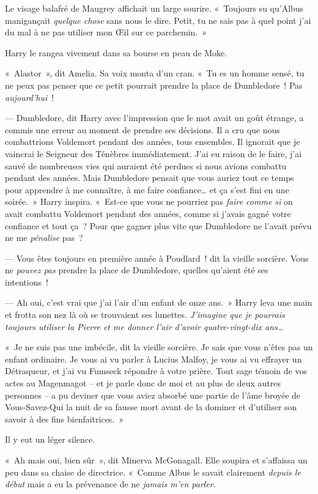 Le visage balafré de Maugrey affichait un large sourire.
«~Toujours su qu'Albus manigançait \emph{quelque chose} sans nous le dire.
Petit, tu ne sais pas à quel point j'ai du mal à ne pas utiliser mon Œil sur ce parchemin.~»

Harry le rangea vivement dans sa bourse en peau de Moke.

«~Alastor~», dit Amelia.
Sa voix monta d'un cran.
«~Tu es un homme sensé, tu ne peux pas penser que ce petit pourrait prendre la place de Dumbledore~!
Pas \emph{aujourd'hui}~!

--- Dumbledore, dit Harry avec l'impression que le mot avait un goût étrange, a commis une erreur au moment de prendre ses décisions.
Il a cru que nous combattrions Voldemort pendant des années, tous ensembles.
Il ignorait que je vaincrai le Seigneur des Ténèbres immédiatement.
J'ai eu raison de le faire, j'ai sauvé de nombreuses vies qui auraient été perdues si nous avions combattu pendant des années.
Mais Dumbledore pensait que vous auriez tout ce temps pour apprendre à me connaître, à me faire confiance… et ça s'est fini en une soirée.~»
Harry inspira.
«~Est-ce que vous ne pourriez pas \emph{faire comme si} on avait combattu Voldemort pendant des années, comme si j'avais gagné votre confiance et tout ça~?
Pour que gagner plus vite que Dumbledore ne l'avait prévu ne me \emph{pénalise} pas~?

--- Vous êtes toujours en première année à Poudlard~! dit la vieille sorcière.
Vous ne \emph{pouvez pas} prendre la place de Dumbledore, quelles qu'aient été ses intentions~!

--- Ah oui, c'est vrai que j'ai l'air d'un enfant de onze ans.~»
Harry leva une main et frotta son nez là où se trouvaient ses lunettes.
\emph{J'imagine que je pourrais toujours utiliser la Pierre et me donner l'air d'avoir quatre-vingt-dix ans…}

«~Je ne suis pas une imbécile, dit la vieille sorcière.
Je sais que vous n'êtes pas un enfant ordinaire.
Je vous ai vu parler à Lucius Malfoy, je vous ai vu effrayer un Détraqueur, et j'ai vu Fumseck répondre à votre prière.
Tout sage témoin de vos actes au Magenmagot -- et je parle donc de moi et au plus de deux autres personnes -- a pu deviner que vous aviez absorbé une partie de l'âme broyée de Vous-Savez-Qui la nuit de sa fausse mort avant de la dominer et d'utiliser son savoir à des fins bienfaitrices.~»

Il y eut un léger silence.

«~Ah mais oui, bien sûr~», dit Minerva McGonagall.
Elle soupira et s'affaissa un peu dans sa chaise de directrice.
«~Comme Albus le savait clairement \emph{depuis le début} mais a eu la prévenance de ne \emph{jamais m'en parler}.

